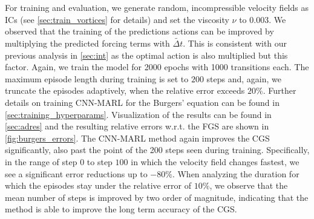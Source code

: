 \documentclass{article}
\theoremstyle{plain}
\theoremstyle{definition}
\theoremstyle{remark}
\begin{document}
For training and evaluation, we generate random, incompressible velocity fields as ICs (see \cref{sec:train_vortices} for details) and set the viscosity $\nu$ to $0.003$. We observed that the training of the predictions actions can be improved by multiplying the predicted forcing terms with $\widetilde{\Delta t}$. This is consistent with our previous analysis in \cref{sec:int} as the optimal action is also multiplied but this factor. Again, we train the model for 2000 epochs with 1000 transitions each. The maximum episode length during training is set to $200$ steps and, again, we truncate the episodes adaptively, when the relative error exceeds $20 \%$. Further details on training CNN-MARL for the Burgers' equation can be found in \cref{sec:training_hyperparams}. Visualization of the results can be found in \cref{sec:adres} and the resulting relative errors w.r.t. the FGS are shown in \cref{fig:burgers_errors}. The CNN-MARL method again improves the CGS significantly, also past the point of the 200 steps seen during training. Specifically, in the range of step $0$ to step $100$ in which the velocity field changes fastest, we see a significant error reductions up to $-80\%$. When analyzing the duration for which the episodes stay under the relative error of $10\%$, we observe that the mean number of steps is improved by two order of magnitude, indicating that the method is able to improve the long term accuracy of the CGS.  
\end{document}
